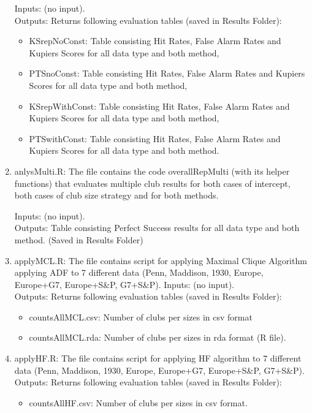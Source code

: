 \documentclass{article}
\begin{document}
\begin{enumerate}
	Inputs: (no input).\\
	Outputs: Returns following evaluation tables (saved in Results Folder):
	\begin{itemize}
		\item KSrepNoConst: Table consisting Hit Rates, False Alarm Rates and Kupiers Scores for all data type and both method,
		\item PTSnoConst: Table consisting Hit Rates, False Alarm Rates and Kupiers Scores for all data type and both method,
		\item KSrepWithConst: Table consisting Hit Rates, False Alarm Rates and Kupiers Scores for all data type and both method,
		\item PTSwithConst: Table consisting Hit Rates, False Alarm Rates and Kupiers Scores for all data type and both method.
		
	\end{itemize}
	
	\item anlysMulti.R: The file contains the code overallRepMulti (with its helper functions) that evaluates multiple club results for both cases of intercept, both cases of club size strategy and for both methods.
	
	Inputs: (no input).\\
	Outputs: Table consisting Perfect Success results for all data type and both method. (Saved in Results Folder)
	\item applyMCL.R: The file contains script for applying Maximal Clique Algorithm applying ADF to 7 different data (Penn, Maddison, 1930, Europe, Europe+G7, Europe+S\&P, G7+S\&P). 
	Inputs: (no input).\\
	Outputs: Returns following evaluation tables (saved in Results Folder):
	\begin{itemize}
		\item countsAllMCL.csv: Number of clubs per sizes in csv format
		\item countsAllMCL.rda: Number of clubs per sizes in rda format (R file). 
	\end{itemize}
	
	\item applyHF.R: The file contains script for applying HF algorithm to 7 different data (Penn, Maddison, 1930, Europe, Europe+G7, Europe+S\&P, G7+S\&P). 
	Outputs: Returns following evaluation tables (saved in Results Folder):
	\begin{itemize}
		\item countsAllHF.csv: Number of clubs per sizes in csv format.
	\end{itemize}


\end{enumerate}
\end{document}
